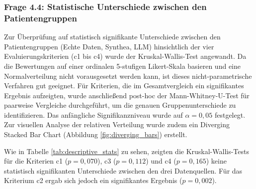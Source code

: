 \subsubsection{Frage 4.4: Statistische Unterschiede zwischen den Patientengruppen}

\begin{description}[style=nextline, font=\bfseries]
\item[Methodik] Zur Überprüfung auf statistisch signifikante Unterschiede zwischen den Patientengruppen (Echte Daten, Synthea, LLM) hinsichtlich der vier Evaluierungskriterien (c1 bis c4) wurde der Kruskal-Wallis-Test angewandt. Da die Bewertungen auf einer ordinalen 5-stufigen Likert-Skala basieren und eine Normalverteilung nicht vorausgesetzt werden kann, ist dieses nicht-parametrische Verfahren gut geeignet. Für Kriterien, die im Gesamtvergleich ein signifikantes Ergebnis aufzeigten, wurde anschließend post-hoc der Mann-Whitney-U-Test für paarweise Vergleiche durchgeführt, um die genauen Gruppenunterschiede zu identifizieren. Das anfängliche Signifikanzniveau wurde auf $\alpha = 0{,}05$ festgelegt. Zur visuellen Analyse der relativen Verteilung wurde zudem ein Diverging Stacked Bar Chart (Abbildung \ref{fig:diverging_bars}) erstellt.

\item[Ergebnisse] Wie in Tabelle \ref{tab:descriptive_stats} zu sehen, zeigten die Kruskal-Wallis-Tests für die Kriterien c1 ($p = 0{,}070$), c3 ($p = 0{,}112$) und c4 ($p = 0{,}165$) keine statistisch signifikanten Unterschiede zwischen den drei Datenquellen. Für das Kriterium c2 ergab sich jedoch ein signifikantes Ergebnis ($p = 0{,}002$). 


\end{description}
